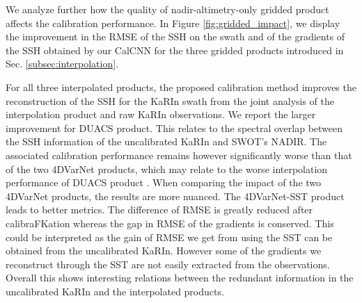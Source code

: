 \begin{bibunit}
We analyze further how the quality of nadir-altimetry-only gridded product affects the calibration performance.
In Figure \ref{fig:gridded_impact}, we display the improvement in the RMSE of the SSH on the swath and of the gradients of the SSH obtained by our CalCNN for the three gridded products introduced in Sec. \ref{subsec:interpolation}.

For all three interpolated products, the proposed calibration method improves the reconstruction of the SSH for the KaRIn swath from the joint analysis of the interpolation product and raw KaRIn observations. We report the larger improvement for DUACS product. This relates to the spectral overlap between the SSH information of the uncalibrated KaRIn and SWOT's NADIR. The associated calibration performance remains however significantly worse than that of the two 4DVarNet products, which may relate to the worse interpolation performance of DUACS product \cite{fablet_end2end_2021,osse_data_challenge}. 
When comparing the impact of the two 4DVarNet products, the results are more nuanced. The 4DVarNet-SST product leads to better metrics. The difference of RMSE is greatly reduced after calibraFKation whereas the gap in RMSE of the gradients is conserved.
This could be interpreted as the gain of RMSE we get from using the SST can be obtained from the uncalibrated KaRIn. However some of the gradients we reconstruct through the SST are not easily extracted from the observations.
Overall this shows interesting relations between the redundant information in the uncalibrated KaRIn and the interpolated products.


\end{bibunit}
